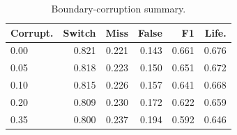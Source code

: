 \begin{table}[t]
\centering
\caption{Boundary-corruption summary.}
\label{tab:boundary-corruption}
\small
\begin{tabular}{lrrrrr}
\toprule
Corrupt. & Switch & Miss & False & F1 & Life. \\
\midrule
0.00 & 0.821 & 0.221 & 0.143 & 0.661 & 0.676 \\
0.05 & 0.818 & 0.223 & 0.150 & 0.651 & 0.672 \\
0.10 & 0.815 & 0.226 & 0.157 & 0.641 & 0.668 \\
0.20 & 0.809 & 0.230 & 0.172 & 0.622 & 0.659 \\
0.35 & 0.800 & 0.237 & 0.194 & 0.592 & 0.646 \\
\bottomrule
\end{tabular}
\end{table}
